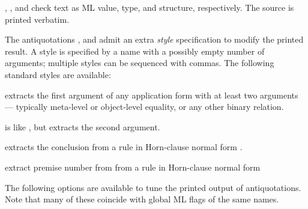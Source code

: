 \begin{isabellebody}
\begin{isamarkuptext}
\begin{description}
  \item {}, , and  check text  as ML value, type, and
  structure, respectively.  The source is printed verbatim.

  \end{description}%
\end{isamarkuptext}%
\isamarkuptrue%
%
\isamarkuptrue%
%
\begin{isamarkuptext}%
The antiquotations ,  and  admit an extra \emph{style} specification to modify the
  printed result.  A style is specified by a name with a possibly
  empty number of arguments;  multiple styles can be sequenced with
  commas.  The following standard styles are available:

  \begin{description}
  
  \item {} extracts the first argument of any application
  form with at least two arguments --- typically meta-level or
  object-level equality, or any other binary relation.
  
  \item {} is like , but extracts the second
  argument.
  
  \item {} extracts the conclusion  from a rule
  in Horn-clause normal form .
  
  \item {}  extract premise number
   from from a rule in Horn-clause
  normal form 

  \end{description}%
\end{isamarkuptext}%
\isamarkuptrue%
%
\isamarkuptrue%
%
\begin{isamarkuptext}%
The following options are available to tune the printed output
  of antiquotations.  Note that many of these coincide with global ML
  flags of the same names.


\end{isamarkuptext}
\end{isabellebody}

